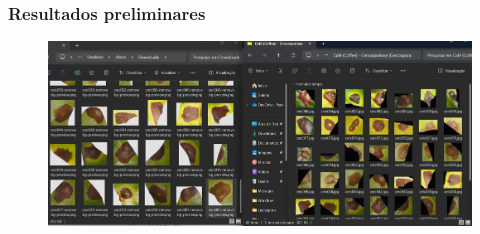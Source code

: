 \documentclass[aspectratio=169]{beamer}
\begin{document}



\begin{frame}
    \frametitle{Resultados preliminares}


    \centering

    \begin{figure}
        \centering
        \includegraphics[scale = 0.45]{img/Captura de tela 2024-04-03 104343.png}
        \label{fig:enter-label}
    \end{figure}

\end{frame}









\end{document}
